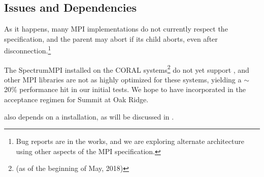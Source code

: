 \subsection{Issues and Dependencies}

As it happens, many MPI implementations do not currently respect the specification, and the \spawn parent may abort if its child aborts, even after disconnection.\footnote{Bug reports are in the works, and we are exploring alternate architecture using other aspects of the MPI specification.}

The SpectrumMPI installed on the CORAL systems\footnote{(as of the beginning of May, 2018)} do not yet support \spawn, and other MPI libraries are not as highly optimized for these systems, yielding a $\sim$20\% performance hit in our initial tests.
We hope to have \spawn incorporated in the acceptance regimen for Summit at Oak Ridge.

\mpijm also depends on a \python installation, as will be discussed in .
